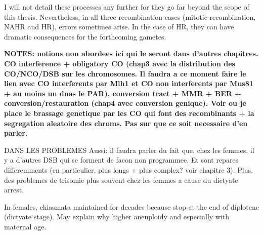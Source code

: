I will not detail these processes any further for they go far beyond the scope of this thesis.
Nevertheless, in all three recombination cases (mitotic recombination, NAHR and HR), errors sometimes arise.
In the case of HR, they can have dramatic consequences for the forthcoming gametes.







\textbf{NOTES\@: notions non abordees ici qui le seront dans d'autres chapitres. CO interference + obligatory CO (chap3 avec la distribution des CO/NCO/DSB sur les chromosomes. Il faudra a ce moment faire le lien avec CO interferents par Mlh1 et CO non interferents par Mus81 + au moins un dnas le PAR), conversion tract + MMR + BER + conversion/restauration (chap4 avec conversion genique). Voir ou je place le brassage genetique par les CO qui font des recombinants + la segregation aleatoire des chroms. Pas sur que ce soit necessaire d'en parler.}



DANS LES PROBLEMES
Aussi: il faudra parler du fait que, chez les femmes, il y a d'autres DSB qui se forment de facon non programmee. Et sont repares differemments (en particulier, plus longs + plus complex? voir chapitre 3). Plus, des problemes de trisomie plus souvent chez les femmes a cause du dictyate arrest.

In females, chiasmata maintained for decades because stop at the end of diplotene (dictyate stage). May explain why higher aneuploidy and especially with maternal age.









